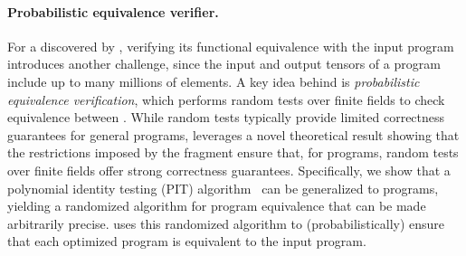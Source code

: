 \paragraph{Probabilistic equivalence verifier.}
For a \graph discovered by \sys, verifying its functional equivalence with the input program introduces another challenge, since the input and output tensors of a program include up to many millions of elements.
A key idea behind \sys is {\em probabilistic equivalence verification}, which performs random tests over finite fields to check equivalence between \graphs.
%
While random tests typically provide limited correctness guarantees for general programs, \sys leverages a novel theoretical result showing that the restrictions imposed by the \lax fragment ensure that, for \lax programs, random tests over finite fields offer strong correctness guarantees.
Specifically, we show that a polynomial identity testing (PIT) algorithm~\cite{schwartz1980fast, zippel1979probabilistic} can be generalized to \lax programs, yielding a randomized algorithm for \lax program equivalence that can be made arbitrarily precise.
\sys uses this randomized algorithm to (probabilistically) ensure that each optimized program is equivalent to the input program.
%
%

